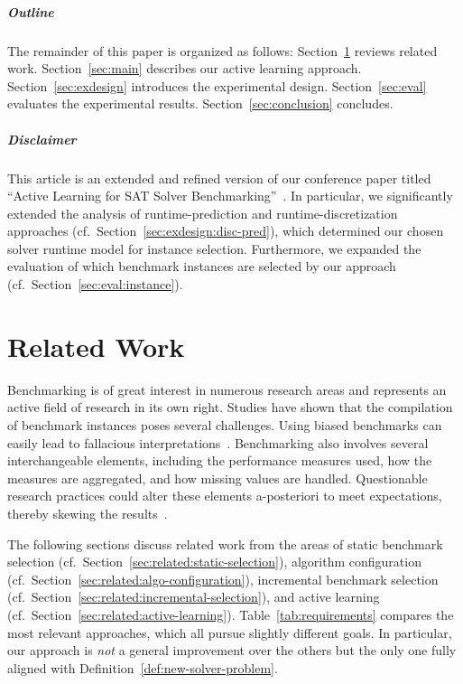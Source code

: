 \documentclass[sn-basic, Numbered]{sn-jnl} %
\begin{document}
\subparagraph{Outline}

The remainder of this paper is organized as follows:
Section~\ref{sec:related} reviews related work.
Section~\ref{sec:main} describes our active learning approach.
Section~\ref{sec:exdesign} introduces the experimental design.
Section~\ref{sec:eval} evaluates the experimental results.
Section~\ref{sec:conclusion} concludes.

\subparagraph{Disclaimer}

This article is an extended and refined version of our conference paper titled ``Active Learning for SAT Solver Benchmarking''~\cite{fuchs2023active}.
In particular, we significantly extended the analysis of runtime-prediction and runtime-discretization approaches (cf.~Section~\ref{sec:exdesign:disc-pred}), which determined our chosen solver runtime model for instance selection.
Furthermore, we expanded the evaluation of which benchmark instances are selected by our approach (cf.~Section~\ref{sec:eval:instance}).

\section{Related Work}
\label{sec:related}

Benchmarking is of great interest in numerous research areas and represents an active field of research in its own right.
Studies have shown that the compilation of benchmark instances poses several challenges.
Using biased benchmarks can easily lead to fallacious interpretations~\cite{abs-2107-07002}.
Benchmarking also involves several interchangeable elements, including the performance measures used, how the measures are aggregated, and how missing values are handled.
Questionable research practices could alter these elements a-posteriori to meet expectations, thereby skewing the results~\cite{NiesslHWCB22}.

The following sections discuss related work from the areas of static benchmark selection (cf.~Section~\ref{sec:related:static-selection}), algorithm configuration (cf.~Section~\ref{sec:related:algo-configuration}), incremental benchmark selection (cf.~Section~\ref{sec:related:incremental-selection}), and active learning (cf.~Section~\ref{sec:related:active-learning}).
Table~\ref{tab:requirements} compares the most relevant approaches, which all pursue slightly different goals.
In particular, our approach is \emph{not} a general improvement over the others but the only one fully aligned with Definition~\ref{def:new-solver-problem}.
\end{document}
